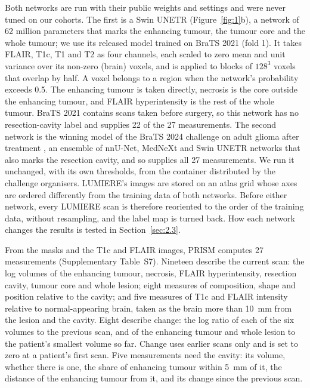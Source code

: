 Both networks are run with their public weights and settings and were never tuned on our cohorts. The first is a Swin
UNETR \citep{hatamizadeh2022} (Figure~\ref{fig:1}b), a network of 62 million parameters that marks the enhancing
tumour, the tumour core and the whole tumour; we use its released model trained on BraTS 2021 (fold 1). It takes
FLAIR, T1c, T1 and T2 as four channels, each scaled to zero mean and unit variance over its non-zero (brain) voxels, and is applied to
blocks of $128^3$ voxels that overlap by half. A voxel belongs to a region when the network's probability exceeds 0.5.
The enhancing tumour is taken directly, necrosis is the core outside the enhancing tumour, and FLAIR hyperintensity is
the rest of the whole tumour. BraTS 2021 contains scans taken before surgery, so this network has no resection-cavity
label and supplies 22 of the 27 measurements. The second network is the winning model of the BraTS 2024 challenge on
adult glioma after treatment \citep{deverdier2024,ferreira2024}, an ensemble of nnU-Net, MedNeXt and Swin UNETR
networks that also marks the resection cavity, and so supplies all 27 measurements. We run it unchanged, with its own
thresholds, from the container distributed by the challenge organisers. LUMIERE's images are stored on an atlas grid whose axes are ordered
differently from the training data of both networks. Before either network, every LUMIERE scan is therefore
reoriented to the order of the training data, without resampling, and the label map is turned back. How each network
changes the results is tested in Section~\ref{sec:2.3}.

From the masks and the T1c and FLAIR images, PRISM computes 27 measurements (Supplementary Table~S7). Nineteen describe
the current scan: the log volumes of the enhancing tumour, necrosis, FLAIR hyperintensity, resection cavity, tumour
core and whole lesion; eight measures of composition, shape and position relative to the cavity; and five measures of
T1c and FLAIR intensity relative to normal-appearing brain, taken as the brain more than 10~mm from the lesion and the
cavity. Eight describe change: the log ratio of each of the six volumes to the previous scan, and of the enhancing
tumour and whole lesion to the patient's smallest volume so far. Change uses earlier scans only and is set to zero at
a patient's first scan. Five measurements need the cavity: its volume, whether there is one, the share of enhancing
tumour within 5~mm of it, the distance of the enhancing tumour from it, and its change since the previous scan.

